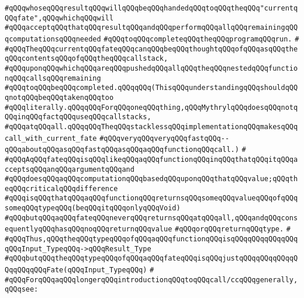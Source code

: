 \verb|#qQQqwhoseqQQqresultqQQqwillqQQqbeqQQqhandedqQQqtoqQQqtheqQQq"currentqQQqfate",qQQqwhichqQQqwill|\newline
\verb|#qQQqacceptqQQqthatqQQqresultqQQqandqQQqperformqQQqallqQQqremainingqQQqcomputationsqQQqneeded|\newline
\verb|#qQQqtoqQQqcompleteqQQqtheqQQqprogramqQQqrun.|\newline
\verb|#|\newline
\verb|#qQQqTheqQQqcurrentqQQqfateqQQqcanqQQqbeqQQqthoughtqQQqofqQQqasqQQqtheqQQqcontentsqQQqofqQQqtheqQQqcallstack,|\newline
\verb|#qQQquponqQQqwhichqQQqareqQQqpushedqQQqallqQQqtheqQQqnestedqQQqfunctionqQQqcallsqQQqremaining|\newline
\verb|#qQQqtoqQQqbeqQQqcompleted.qQQqqQQq(ThisqQQqunderstandingqQQqshouldqQQqnotqQQqbeqQQqtakenqQQqtoo|\newline
\verb|#qQQqliterally.qQQqqQQqForqQQqoneqQQqthing,qQQqMythrylqQQqdoesqQQqnotqQQqinqQQqfactqQQquseqQQqcallstacks,|\newline
\verb|#qQQqatqQQqall.qQQqqQQqTheqQQqstacklessqQQqimplementationqQQqmakesqQQqcall_with_current_fate|\newline
\verb|#qQQqveryqQQqveryqQQqfastqQQq--qQQqaboutqQQqasqQQqfastqQQqasqQQqaqQQqfunctionqQQqcall.)|\newline
\verb|#|\newline
\verb|#qQQqAqQQqfateqQQqisqQQqlikeqQQqaqQQqfunctionqQQqinqQQqthatqQQqitqQQqacceptsqQQqanqQQqargumentqQQqand|\newline
\verb|#qQQqdoesqQQqaqQQqcomputationqQQqbasedqQQquponqQQqthatqQQqvalue;qQQqtheqQQqcriticalqQQqdifference|\newline
\verb|#qQQqisqQQqthatqQQqaqQQqfunctionqQQqreturnsqQQqsomeqQQqvalueqQQqofqQQqsomeqQQqtypeqQQq(beqQQqitqQQqonlyqQQqVoid)|\newline
\verb|#qQQqbutqQQqaqQQqfateqQQqneverqQQqreturnsqQQqatqQQqall,qQQqandqQQqconsequentlyqQQqhasqQQqnoqQQqreturnqQQqvalue|\newline
\verb|#qQQqorqQQqreturnqQQqtype.|\newline
\verb|#|\newline
\verb|#qQQqThus,qQQqtheqQQqtypeqQQqofqQQqaqQQqfunctionqQQqisqQQqqQQqqQQqqQQqqQQqInput_TypeqQQq->qQQqResult_Type|\newline
\verb|#qQQqbutqQQqtheqQQqtypeqQQqofqQQqaqQQqfateqQQqisqQQqjustqQQqqQQqqQQqqQQqqQQqqQQqFate(qQQqInput_TypeqQQq)|\newline
\verb|#|\newline
\verb|#qQQqForqQQqaqQQqlongerqQQqintroductionqQQqtoqQQqcall/ccqQQqgenerally,qQQqsee:|\newline

